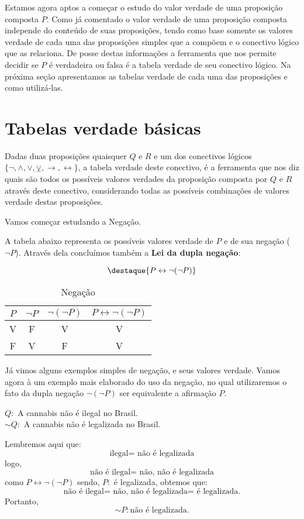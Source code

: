  Estamos agora aptos a começar o estudo do valor verdade de uma proposição composta $P$. Como já comentado o valor verdade de uma proposição composta independe do conteúdo de suas proposições, tendo como base somente os valores verdade de cada uma das proposições simples que a compõem e o conectivo lógico que as relaciona. De posse destas informações a ferramenta que nos permite decidir se $P$ é verdadeira ou falsa é a tabela verdade de seu conectivo lógico. Na próxima seção apresentamos as tabelas verdade de cada uma das proposições e como utilizá-las.

\section{Tabelas verdade básicas}

 Dadas duas proposições quaisquer $Q$ e $R$ e um dos conectivos lógicos $\{\neg, \land, \lor, \veebar, \rightarrow, \leftrightarrow \}$, a tabela verdade deste conectivo, é a ferramenta que nos diz quais são todos os possíveis valores verdades da proposição composta por $Q$ e $R$ através deste conectivo, considerando todas as possíveis combinações de valores verdade destas proposições.

 Vamos começar estudando a Negação.

 A tabela abaixo representa os possíveis valores verdade de $P$ e de sua negação ($\neg P$). Através dela concluímos também a \textbf{Lei da dupla negação}:

  \[\destaque{P \leftrightarrow \neg(\neg P)}\]

 \begin{table}[H]
 \centering
 \begin{tabular}{|c|c|c|c|} \hline
 \rowcolor{cinza}
 $P$ & $\neg P$ & $\neg (\neg P)$ & $ P \leftrightarrow \neg (\neg P)$\\ \hline
 V & F & V & V \\ \hline
 F & V & F & V \\ \hline
 \end{tabular}
 \caption{Negação}
\end{table}

 Já vimos alguns exemplos simples de negação, e seus valores verdade. Vamos agora à um exemplo mais elaborado do uso da negação, no qual utilizaremos o fato da dupla negação $\neg(\neg P)$ ser equivalente a afirmação $P$.

 \begin{exem}
 $Q:$ A cannabis não é ilegal no Brasil.\\
 $\sim Q:$ A cannabis não é legalizada no Brasil.

 Lembremos aqui que:
   \[\text{ilegal= não é legalizada}\]
 logo,
   \[\text{não é ilegal= não, não é legalizada}\]
 como $P \leftrightarrow \neg(\neg P)$ sendo, $P:$ é legalizada, obtemos que:
   \[\text{não é ilegal= não, não é legalizada= é legalizada.}\]
 Portanto,
    \[\sim P:\text{não é legalizada.}\]

    \fim
 \end{exem}


